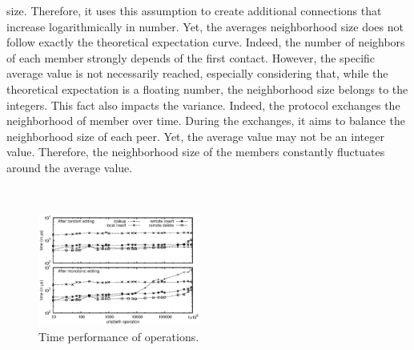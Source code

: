 \begin{asparadesc}
  size. Therefore, it uses this assumption to create additional connections that
  increase logarithmically in number. Yet, the averages neighborhood size does
  not follow exactly the theoretical expectation curve. Indeed, the number of
  neighbors of each member strongly depends of the first contact. However, the
  specific average value is not necessarily reached, especially considering
  that, while the theoretical expectation is a floating number, the neighborhood
  size belongs to the integers. This fact also impacts the variance. Indeed, the
  \SPRAY protocol exchanges the neighborhood of member over time. During the
  exchanges, it aims to balance the neighborhood size of each peer. Yet, the
  average value may not be an integer value. Therefore, the neighborhood size of
  the members constantly fluctuates around the average value.
\end{asparadesc}

\ \\

\begin{figure}
  \centering
  \includegraphics[width=0.475\textwidth]{./img/bench.eps}
  \caption{\label{fig:bench} Time performance of operations.}
\end{figure}

